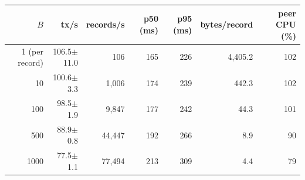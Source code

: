 \begin{widetable}
\centering
\caption{Anchoring on Fabric: per-record transactions versus Merkle batches of $B$ records (closed loop, 16 clients, 120~s measurement after 15~s warm-up, mean of 3 repetitions). Ledger bytes are the growth of the peer's block store per committed record.}
\label{tab:bench}
\small
\begin{tabular}{rrrrrrr}
\toprule
$B$ & tx/s & records/s & p50 (ms) & p95 (ms) & bytes/record & peer CPU (\%) \\
\midrule
1 (per record) & 106.5$\pm$11.0 & 106 & 165 & 226 & 4,405.2 & 102 \\
10 & 100.6$\pm$3.3 & 1,006 & 174 & 239 & 442.3 & 102 \\
100 & 98.5$\pm$1.9 & 9,847 & 177 & 242 & 44.3 & 101 \\
500 & 88.9$\pm$0.8 & 44,447 & 192 & 266 & 8.9 & 90 \\
1000 & 77.5$\pm$1.1 & 77,494 & 213 & 309 & 4.4 & 79 \\
\bottomrule
\end{tabular}
\end{widetable}
